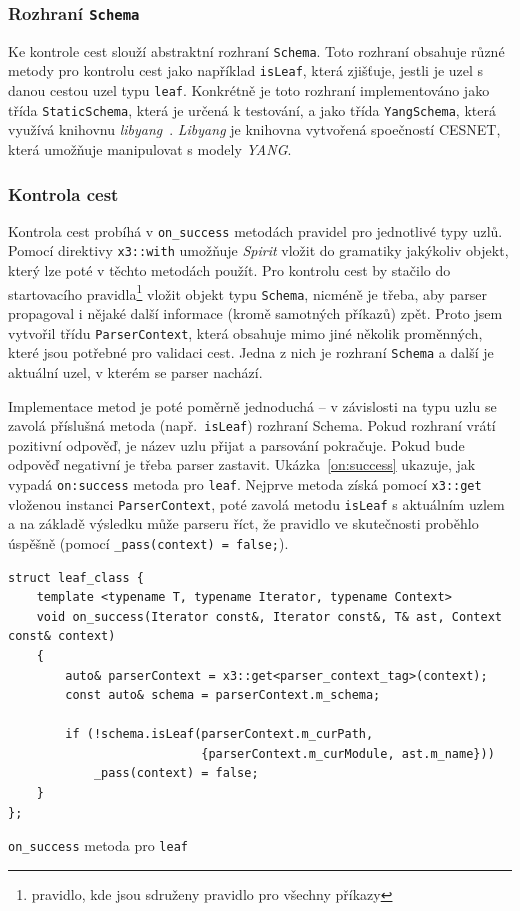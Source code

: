 \documentclass[thesis=B,czech,hidelinks]{FITthesis}[2019/03/06]
\begin{document}
\subsubsection{Rozhraní \texttt{Schema}}
Ke kontrole cest slouží abstraktní rozhraní \texttt{Schema}. Toto rozhraní obsahuje různé metody pro kontrolu cest jako například \texttt{isLeaf}, která zjišťuje, jestli je uzel s danou cestou uzel typu \texttt{leaf}. Konkrétně je toto rozhraní implementováno jako třída \texttt{StaticSchema}, která je určená k testování, a jako třída \texttt{YangSchema}, která využívá knihovnu \textit{libyang}~\cite{libyang}. \textit{Libyang} je knihovna vytvořená spoečností CESNET, která umožňuje manipulovat s modely \textit{YANG}.

\subsubsection{Kontrola cest}\label{path:checking}
Kontrola cest probíhá v \verb¨on_success¨ metodách pravidel pro jednotlivé typy uzlů. Pomocí direktivy \texttt{x3::with} umožňuje \textit{Spirit} vložit do gramatiky jakýkoliv objekt, který lze poté v těchto metodách použít. Pro kontrolu cest by stačilo do startovacího pravidla\footnote{pravidlo, kde jsou sdruženy pravidlo pro všechny příkazy} vložit objekt typu \texttt{Schema}, nicméně je třeba, aby parser propagoval i nějaké další informace (kromě samotných příkazů) zpět. Proto jsem vytvořil třídu \texttt{ParserContext}, která obsahuje mimo jiné několik proměnných, které jsou potřebné pro validaci cest. Jedna z nich je rozhraní \texttt{Schema} a další je aktuální uzel, v kterém se parser nachází.

Implementace metod je poté poměrně jednoduchá -- v závislosti na typu uzlu se zavolá příslušná metoda (např.\ \texttt{isLeaf}) rozhraní Schema. Pokud rozhraní vrátí pozitivní odpověď, je název uzlu přijat a parsování pokračuje. Pokud bude odpověď negativní je třeba parser zastavit. Ukázka~\ref{on:success} ukazuje, jak vypadá \verb¨on:success¨ metoda pro \texttt{leaf}. Nejprve metoda získá pomocí \texttt{x3::get} vloženou instanci \texttt{ParserContext}, poté zavolá metodu \texttt{isLeaf} s aktuálním uzlem a na základě výsledku může parseru říct, že pravidlo ve skutečnosti proběhlo úspěšně (pomocí \verb¨_pass(context) = false;¨).

\begin{listing}
\begin{verbatim}
struct leaf_class {
    template <typename T, typename Iterator, typename Context>
    void on_success(Iterator const&, Iterator const&, T& ast, Context const& context)
    {
        auto& parserContext = x3::get<parser_context_tag>(context);
        const auto& schema = parserContext.m_schema;

        if (!schema.isLeaf(parserContext.m_curPath,
                           {parserContext.m_curModule, ast.m_name}))
            _pass(context) = false;
    }
};
\end{verbatim}
\caption{\texttt{on\_success} metoda pro \texttt{leaf}}\label{on:success}
\end{listing}
\end{document}
